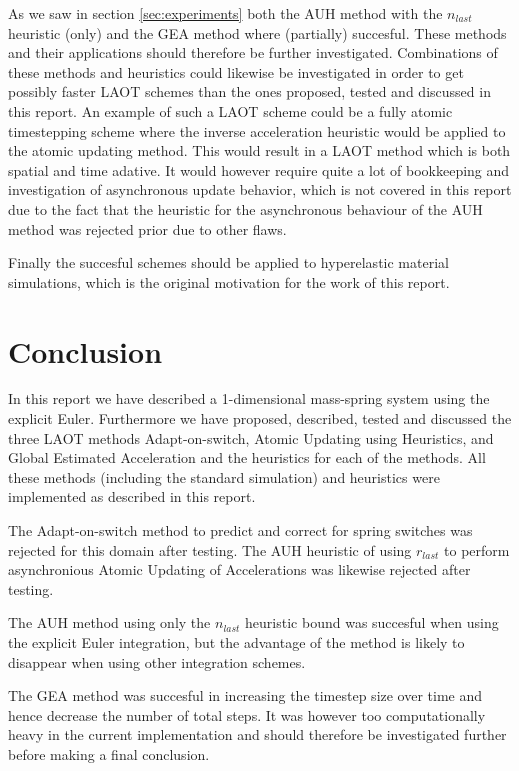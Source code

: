 \documentclass[11pt]{article}
\begin{document}
As we saw in section \ref{sec:experiments} both the AUH method with the
$n_{last}$ heuristic (only) and the GEA method where (partially) succesful.
These methods and their applications should therefore be further investigated.
Combinations of these methods and heuristics could likewise be investigated in
order to get possibly faster LAOT schemes than the ones proposed, tested and
discussed in this report. An example of such a LAOT scheme could be a fully
atomic timestepping scheme where the inverse acceleration heuristic would be
applied to the atomic updating method. This would result in a LAOT method
which is both spatial and time adative. It would however require quite a lot
of bookkeeping and investigation of asynchronous update behavior, which is not
covered in this report due to the fact that the heuristic for the asynchronous
behaviour of the AUH method was rejected prior due to other flaws.

Finally the succesful schemes should be applied to hyperelastic material
simulations, which is the original motivation for the work of this report.


\section{Conclusion}
In this report we have described a 1-dimensional mass-spring system using the
explicit Euler. Furthermore we have proposed, described, tested and discussed
the three LAOT methods Adapt-on-switch, Atomic Updating using Heuristics, and
Global Estimated Acceleration and the heuristics for each of the methods.
All these methods (including the standard simulation) and heuristics were
implemented as described in this report.

The Adapt-on-switch method to predict and correct for spring switches was
rejected for this domain after testing. The AUH heuristic of using $r_{last}$
to perform asynchronious Atomic Updating of Accelerations was likewise
rejected after testing.

The AUH method using only the $n_{last}$ heuristic bound was succesful when
using the explicit Euler integration, but the advantage of the method is
likely to disappear when using other integration schemes.

The GEA method was succesful in increasing the timestep size over time and
hence decrease the number of total steps. It was however too computationally
heavy in the current implementation and should therefore be investigated further
before making a final conclusion.
\end{document}
